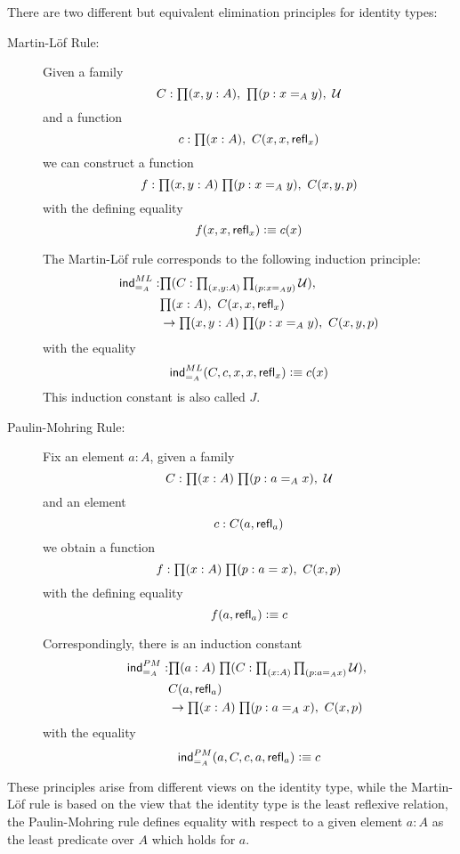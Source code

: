 There are two different but equivalent elimination principles for
identity types:
\begin{description}
\item[Martin-L\"{o}f Rule:] 
Given a family 
\[ C : \prd{x,y:A}\prd{p:x =_A y} \UU \]
and a function
\[ c :  \prd{x:A} C(x,x,\refl{x})\]
we can construct a function
\[ f : \prd{x,y:A}{p:x =_A y} C(x,y,p) \]
with the defining equality 
\[ f(x,x,\mathsf{refl}_{x}) \vcentcolon\equiv c(x) \]

The Martin-L\"of rule corresponds to the following induction principle:
\begin{align*}
 \ind{=_A}^{ML} : & \prd{C : \prd{x,y:A}\prd{p:x =_A y} \UU}  \\
     & \prd{x:A} C(x,x,\refl{x})  \\
     & \to  \prd{x,y:A}{p:x =_A y} C(x,y,p)
\end{align*}
with the equality
\[ \mathsf{ind}_{=_A}^{ML}(C,c,x,x,\mathsf{refl}_{x}) \vcentcolon\equiv c(x) \]
This induction constant is also called $J$.

\item[Paulin-Mohring Rule:] 

Fix an element $a:A$, given a family
\[ C : \prd{x:A}{p : a =_A x} \UU \]
and an element
\[ c : C(a,\mathsf{refl}_{a}) \]
we obtain a function
\[ f : \prd{x:A}{p:a = x} C(x,p) \]
with the defining equality
\[ f(a,\mathsf{refl}_{a}) \vcentcolon\equiv c \]

Correspondingly, there is an induction constant
\begin{align*}
\ind{=_A}^{PM} : & \prd{a:A}{C : \prd{x:A}{p : a =_A x} \UU} \\
& C(a,\refl{a}) \\
& \to \prd{x:A}{p : a =_A x} C(x,p) 
\end{align*}
with the equality
\[ \mathsf{ind}_{=_A}^{PM}(a,C,c,a,\mathsf{refl}_{a}) \vcentcolon\equiv c \]
\end{description}
These principles arise from different views on the identity type,
while the Martin-L\"of rule is based on the view that the identity
type is the least reflexive relation, the Paulin-Mohring rule defines 
equality with respect to a given element $a:A$ as the least predicate
over $A$ which holds for $a$.

